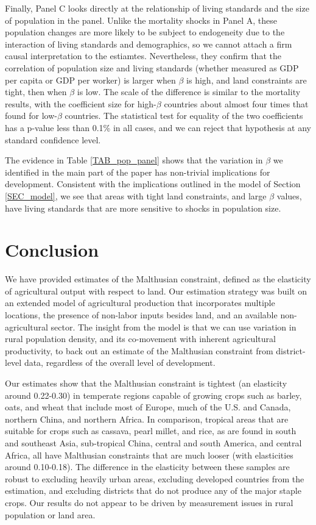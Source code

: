 \documentclass[11pt]{article}
\begin{document}
Finally, Panel C looks directly at the relationship of living standards and the size of population in the panel. Unlike the mortality shocks in Panel A, these population changes are more likely to be subject to endogeneity due to the interaction of living standards and demographics, so we cannot attach a firm causal interpretation to the estiamtes. Nevertheless, they confirm that the correlation of population size and living standards (whether measured as GDP per capita or GDP per worker) is larger when $\beta$ is high, and land constraints are tight, then when $\beta$ is low. The scale of the difference is similar to the mortality results, with the coefficient size for high-$\beta$ countries about almost four times that found for low-$\beta$ countries. The statistical test for equality of the two coefficients has a p-value less than 0.1\% in all cases, and we can reject that hypothesis at any standard confidence level. 

The evidence in Table \ref{TAB_pop_panel} shows that the variation in $\beta$ we identified in the main part of the paper has non-trivial implications for development. Consistent with the implications outlined in the model of Section \ref{SEC_model}, we see that areas with tight land constraints, and large $\beta$ values, have living standards that are more sensitive to shocks in population size. 

\section{Conclusion}
We have provided estimates of the Malthusian constraint, defined as the elasticity of agricultural output with respect to land. Our estimation strategy was built on an extended model of agricultural production that incorporates multiple locations, the presence of non-labor inputs besides land, and an available non-agricultural sector. The insight from the model is that we can use variation in rural population density, and its co-movement with inherent agricultural productivity, to back out an estimate of the Malthusian constraint from district-level data, regardless of the overall level of development.

Our estimates show that the Malthusian constraint is tightest (an elasticity around 0.22-0.30) in temperate regions capable of growing crops such as barley, oats, and wheat that include most of Europe, much of the U.S. and Canada, northern China, and northern Africa. In comparison, tropical areas that are suitable for crops such as cassava, pearl millet, and rice, as are found in south and southeast Asia, sub-tropical China, central and south America, and central Africa, all have Malthusian constraints that are much looser (with elasticities around 0.10-0.18). The difference in the elasticity between these samples are robust to excluding heavily urban areas, excluding developed countries from the estimation, and excluding districts that do not produce any of the major staple crops. Our results do not appear to be driven by measurement issues in rural population or land area.
\end{document}
